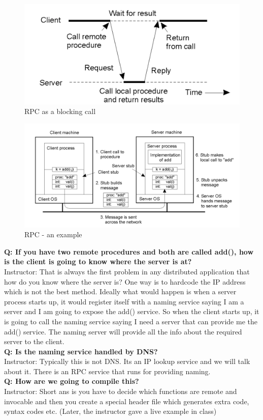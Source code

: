 \documentclass[twoside]{article}
\begin{document}
\begin{figure}[h]
\centering
\includegraphics[scale=0.35]{rpc_blocking.png}
\caption{RPC as a blocking call}
\end{figure}

\begin{figure}[!h]
\centering
\includegraphics[scale=0.5]{rpc_flow.png}
\caption{RPC - an example}
\end{figure}

\textbf{Q: If you have two remote procedures and both are called add(), how is the client is going to know where the server is at?}
\\{Instructor: That is always the first problem in any distributed application that how do you know where the server is? One way is to hardcode the IP address which is not the best method. Ideally what would happen is when a server process starts up, it would register itself with a naming service saying I am a server and I am going to expose the add() service. So when the client starts up, it is going to call the naming service saying I need a server that can provide me the add() service. The naming server will provide all the info about the required server to the client.}
\\\textbf{Q: Is the naming service handled by DNS?}
\\{Instructor: Typically this is not DNS. Its an IP lookup service and we will talk about it. There is an RPC service that runs for providing naming.}
\\\textbf{Q: How are we going to compile this?}
\\{Instructor: Short ans is you have to decide which functions are remote and invocable and then you create a special header file which generates extra code, syntax codes etc. (Later, the instructor gave a live example in class)}
\end{document}
